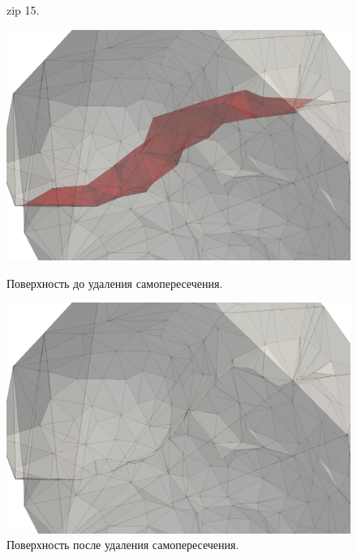 \begin{figure}
\begin{minipage}[b]{0.32\textwidth}
    \caption{zip 15.}\label{fig:pic_zip_15}
  \end{minipage}
\end{figure}

\begin{figure}
  \centering
  \begin{minipage}[b]{0.49\textwidth}
    \includegraphics[width=\textwidth]{pics/pic_self_intersection_on.png}
    \caption{Поверхность до удаления самопересечения.}\label{fig:pic_self_intersection_on}
  \end{minipage}
  \hfill
  \begin{minipage}[b]{0.49\textwidth}
    \includegraphics[width=\textwidth]{pics/pic_self_intersection_off.png}
    \caption{Поверхность после удаления самопересечения.}\label{fig:pic_self_intersection_off}
  \end{minipage}
\end{figure}

